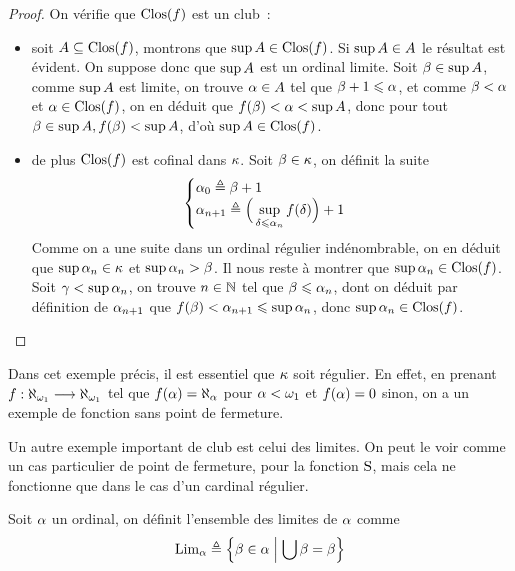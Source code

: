 \begin{proof}
  On vérifie que $\operatorname{Clos}(f)$ est un club~:
  \begin{itemize}
  \item soit $A\subseteq \operatorname{Clos}(f)$, montrons que
    $\sup A \in \operatorname{Clos}(f)$. Si $\sup A \in A$ le résultat est
    évident. On suppose donc que $\sup A$ est un ordinal limite. Soit
    $\beta \in \sup A$, comme $\sup A$ est limite, on trouve
    $\alpha \in A$ tel que $\beta + 1 \leqslant \alpha$, et comme
    $\beta < \alpha$ et $\alpha \in \operatorname{Clos}(f)$, on en déduit que
    $f(\beta) < \alpha < \sup A$, donc pour tout
    $\beta \in \sup A, f(\beta) < \sup A$, d'où
    $\sup A\in \operatorname{Clos}(f)$.
  \item de plus $\operatorname{Clos}(f)$ est cofinal dans $\kappa$. Soit $\beta\in\kappa$, on
    définit la suite
    \[\begin{cases}
    \alpha_0 \triangleq \beta + 1 \\
    \alpha_{n+1} \triangleq \displaystyle
    \Big(\sup_{\delta \leqslant \alpha_n} f(\delta)\Big) + 1
    \end{cases}\]
    Comme on a une suite dans un ordinal régulier indénombrable, on en déduit
    que $\sup \alpha_n \in \kappa$ et $\sup \alpha_n > \beta$. Il nous reste à
    montrer que $\sup \alpha_n \in \operatorname{Clos}(f)$. Soit $\gamma < \sup \alpha_n$, on
    trouve $n \in \mathbb N$ tel que $\beta \leqslant \alpha_n$, dont on déduit par
    définition de $\alpha_{n+ 1}$ que $f(\beta) < \alpha_{n+1}\leqslant \sup\alpha_n$,
    donc $\sup\alpha_n\in\operatorname{Clos}(f)$.\qedhere
  \end{itemize}
\end{proof}

Dans cet exemple précis, il est essentiel que $\kappa$ soit régulier. En effet,
en prenant $f : \displaystyle \aleph_{\omega_1} \longrightarrow \aleph_{\omega_1}$ tel que
$f(\alpha) = \aleph_\alpha$ pour $\alpha < \omega_1$ et $f(\alpha) = 0$ sinon,
on a un exemple de fonction sans point de fermeture.

Un autre exemple important de club est celui des limites. On peut le voir comme
un cas particulier de point de fermeture, pour la fonction $\operatorname{S}$, mais cela ne
fonctionne que dans le cas d'un cardinal régulier.

\begin{definition}
  Soit $\alpha$ un ordinal, on définit l'ensemble des limites de $\alpha$ comme
  \[\operatorname{Lim}_\alpha \triangleq
  \left\{ \beta \in \alpha \;\middle\vert\; \bigcup \beta = \beta \right\}\]
\end{definition}

